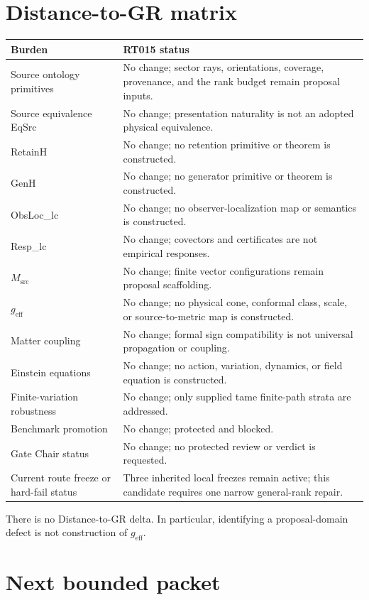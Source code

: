 \documentclass[11pt]{article}
\begin{document}
\section{Distance-to-GR matrix}

\begin{longtable}{p{}p{}}
\toprule
Burden & RT015 status \\
\midrule
Source ontology primitives & No change; sector rays, orientations, coverage, provenance, and the rank budget remain proposal inputs. \\
Source equivalence EqSrc & No change; presentation naturality is not an adopted physical equivalence. \\
RetainH & No change; no retention primitive or theorem is constructed. \\
GenH & No change; no generator primitive or theorem is constructed. \\
ObsLoc\_lc & No change; no observer-localization map or semantics is constructed. \\
Resp\_lc & No change; covectors and certificates are not empirical responses. \\
$M_{\mathrm{src}}$ & No change; finite vector configurations remain proposal scaffolding. \\
$g_{\mathrm{eff}}$ & No change; no physical cone, conformal class, scale, or source-to-metric map is constructed. \\
Matter coupling & No change; formal sign compatibility is not universal propagation or coupling. \\
Einstein equations & No change; no action, variation, dynamics, or field equation is constructed. \\
Finite-variation robustness & No change; only supplied tame finite-path strata are addressed. \\
Benchmark promotion & No change; protected and blocked. \\
Gate Chair status & No change; no protected review or verdict is requested. \\
Current route freeze or hard-fail status & Three inherited local freezes remain active; this candidate requires one narrow general-rank repair. \\
\bottomrule
\end{longtable}

There is no Distance-to-GR delta.  In particular, identifying a proposal-domain
defect is not construction of $g_{\mathrm{eff}}$.

\section{Next bounded packet}
\end{document}

